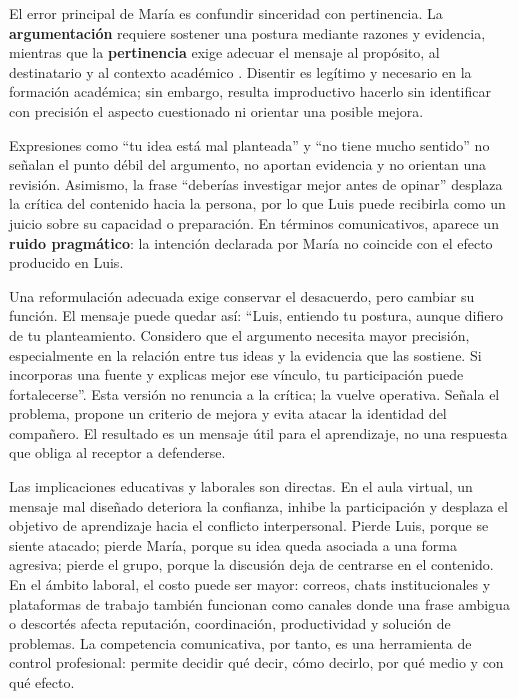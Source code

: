 \documentclass[
	spanish, %
	letterpaper, oneside
]{article}
\begin{document}
El error principal de María es confundir sinceridad con pertinencia. La \textbf{argumentación} requiere sostener una postura mediante razones y evidencia, mientras que la \textbf{pertinencia} exige adecuar el mensaje al propósito, al destinatario y al contexto académico \citep{ayala2005taller,romero2022taller}. Disentir es legítimo y necesario en la formación académica; sin embargo, resulta improductivo hacerlo sin identificar con precisión el aspecto cuestionado ni orientar una posible mejora.

Expresiones como ``tu idea está mal planteada'' y ``no tiene mucho sentido'' no señalan el punto débil del argumento, no aportan evidencia y no orientan una revisión. Asimismo, la frase ``deberías investigar mejor antes de opinar'' desplaza la crítica del contenido hacia la persona, por lo que Luis puede recibirla como un juicio sobre su capacidad o preparación. En términos comunicativos, aparece un \textbf{ruido pragmático}: la intención declarada por María no coincide con el efecto producido en Luis.

Una reformulación adecuada exige conservar el desacuerdo, pero cambiar su función. El mensaje puede quedar así: ``Luis, entiendo tu postura, aunque difiero de tu planteamiento. Considero que el argumento necesita mayor precisión, especialmente en la relación entre tus ideas y la evidencia que las sostiene. Si incorporas una fuente y explicas mejor ese vínculo, tu participación puede fortalecerse''. Esta versión no renuncia a la crítica; la vuelve operativa. Señala el problema, propone un criterio de mejora y evita atacar la identidad del compañero. El resultado es un mensaje útil para el aprendizaje, no una respuesta que obliga al receptor a defenderse.

Las implicaciones educativas y laborales son directas. En el aula virtual, un mensaje mal diseñado deteriora la confianza, inhibe la participación y desplaza el objetivo de aprendizaje hacia el conflicto interpersonal. Pierde Luis, porque se siente atacado; pierde María, porque su idea queda asociada a una forma agresiva; pierde el grupo, porque la discusión deja de centrarse en el contenido. En el ámbito laboral, el costo puede ser mayor: correos, chats institucionales y plataformas de trabajo también funcionan como canales donde una frase ambigua o descortés afecta reputación, coordinación, productividad y solución de problemas. La competencia comunicativa, por tanto, es una herramienta de control profesional: permite decidir qué decir, cómo decirlo, por qué medio y con qué efecto.
\end{document}
